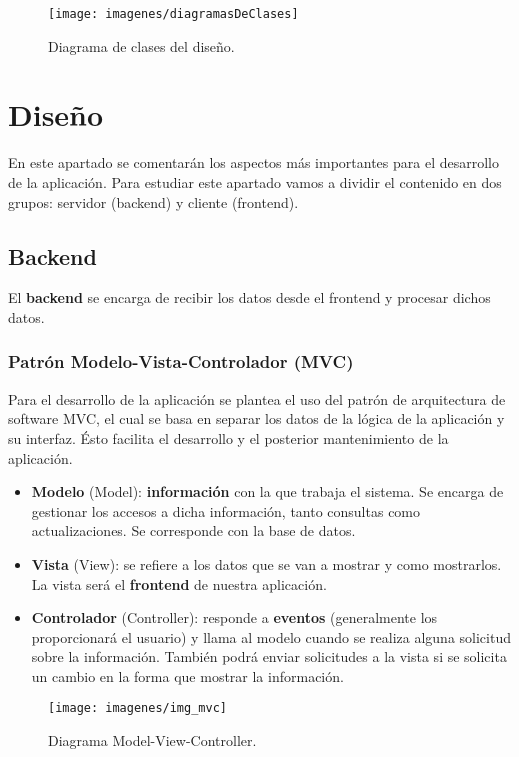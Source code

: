 \begin{figure}[H]
	\centering
	\texttt{[image: imagenes/diagramasDeClases]}
	\caption{Diagrama de clases del diseño.}
	\label{fig:diagramasDeClases}
\end{figure}

\newpage
\section{Diseño}
En este apartado se comentarán los aspectos más importantes para el desarrollo de la aplicación. Para estudiar este apartado vamos a dividir el contenido en dos grupos: servidor (backend) y cliente (frontend).
\subsection{Backend}
El \textbf{backend} se encarga de recibir los datos desde el frontend y procesar dichos datos. \\

\hfill\begin{minipage}{\dimexpr\textwidth-1cm}
	\subsubsection{Patrón Modelo-Vista-Controlador (MVC)}
	Para el desarrollo de la aplicación se plantea el uso del patrón de arquitectura de software MVC, el cual se basa en separar los datos de la lógica de la aplicación y su interfaz. Ésto facilita el desarrollo y el posterior mantenimiento de la aplicación.
	\begin{itemize}
		\item \textbf{Modelo} (Model): \textbf{información} con la que trabaja el sistema. Se encarga de gestionar los accesos a dicha información, tanto consultas como actualizaciones. Se corresponde con la base de datos.
		\item \textbf{Vista} (View): se refiere a los datos que se van a mostrar y como mostrarlos. La vista será el \textbf{frontend} de nuestra aplicación.
		\item \textbf{Controlador} (Controller): responde a \textbf{eventos} (generalmente los proporcionará el usuario) y llama al modelo cuando se realiza alguna solicitud sobre la información. También podrá enviar solicitudes a la vista si se solicita un cambio en la forma que mostrar la información. \\
	\end{itemize}
	
	\begin{figure}[H]
		\centering
		\texttt{[image: imagenes/img\_mvc]}
		\caption{Diagrama Model-View-Controller.}
		\label{fig:img_mvc}
	\end{figure}
\end{minipage}


